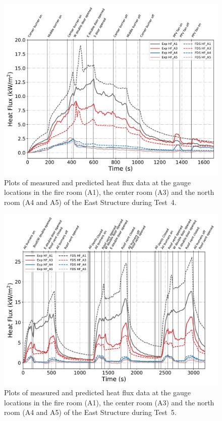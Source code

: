 \begin{figure}[!h]
	\centering
	\includegraphics[width=\columnwidth]{Figures/Plots/Validation/Heat_Flux/Test_4_HFs}
	\caption[Plots of measured and predicted heat flux data during Test~4.]{Plots of measured and predicted heat flux data at the gauge locations in the fire room (A1), the center room (A3) and the north room (A4 and A5) of the East Structure during Test~4.}
	\label{fig:Test4_HFs}
\end{figure}

\begin{figure}[!h]
	\centering
	\includegraphics[width=\columnwidth]{Figures/Plots/Validation/Heat_Flux/Test_5_HFs}
	\caption[Plots of measured and predicted heat flux data during Test~5.]{Plots of measured and predicted heat flux data at the gauge locations in the fire room (A1), the center room (A3) and the north room (A4 and A5) of the East Structure during Test~5.}
	\label{fig:Test5_HFs}
\end{figure}

